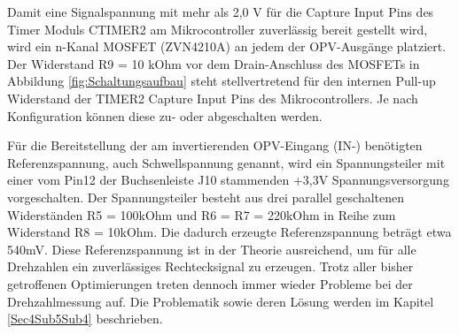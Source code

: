 Damit eine Signalspannung mit mehr als 2,0 V für die Capture Input Pins des Timer Moduls CTIMER2 am Mikrocontroller zuverlässig bereit gestellt wird, wird ein n-Kanal MOSFET (ZVN4210A) an jedem der OPV-Ausgänge platziert. Der Widerstand R9 = 10 kOhm vor dem Drain-Anschluss des MOSFETs in Abbildung \ref{fig:Schaltungsaufbau} steht stellvertretend für den internen Pull-up Widerstand der TIMER2 Capture Input Pins des Mikrocontrollers. Je nach Konfiguration können diese zu- oder abgeschalten werden.\vspace{11pt}

Für die Bereitstellung der am invertierenden OPV-Eingang (IN-) benötigten Referenzspannung, auch Schwellspannung genannt, wird ein Spannungsteiler mit einer vom Pin12 der Buchsenleiste J10 stammenden +3,3V Spannungsversorgung vorgeschalten. Der Spannungsteiler besteht aus drei parallel geschaltenen Widerständen R5 = 100kOhm und R6 = R7 = 220kOhm in Reihe zum Widerstand R8 = 10kOhm. Die dadurch erzeugte Referenzspannung beträgt etwa 540mV. Diese Referenzspannung ist in der Theorie ausreichend, um für alle Drehzahlen ein zuverlässiges Rechtecksignal zu erzeugen. Trotz aller bisher getroffenen Optimierungen treten dennoch immer wieder Probleme bei der Drehzahlmessung auf. Die Problematik sowie deren Lösung werden im Kapitel \ref{Sec4Sub5Sub4}  beschrieben.

